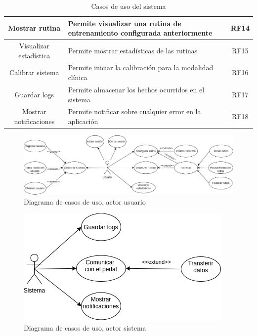 \begin{table}[!ht]
\begin{tabularx}{\textwidth}{|c|X|c|}
        Mostrar rutina & Permite visualizar una rutina de entrenamiento configurada anteriormente &RF14\\\hline
        Visualizar estadística & Permite mostrar estadísticas de las rutinas & RF15\\\hline
        Calibrar sistema & Permite iniciar la calibración para la modalidad clínica  & RF16\\\hline
        Guardar logs & Permite almacenar los hechos ocurridos en el sistema & RF17\\\hline
        Mostrar notificaciones & Permite notificar sobre cualquier error en la aplicación & RF18\\\hline
    \end{tabularx}
    \caption{Casos de uso del sistema}
    \label{tab: rf}
\end{table}

\begin{figure}[h]
    \centering
    \includegraphics[scale=0.44]{images/diagram-usecase-user.png}
    \caption{Diagrama de casos de uso, actor usuario}
    \label{fig: use-cases-user}
\end{figure}

\begin{figure}[h]
    \centering
    \includegraphics[scale=0.44]{images/diagram-usecase-system.png}
    \caption{Diagrama de casos de uso, actor sistema}
    \label{fig: use-cases-system}
\end{figure}

